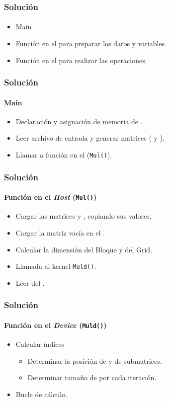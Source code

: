 \frame
{
\frametitle{Solución}
\framesubtitle{}
\begin{itemize}
	\item<1-> Main
	\item<2-> Función en el  para preparar los datos y variables.
	\item<3-> Función en el  para realizar las operaciones.
\end{itemize}
}


\frame
{
\frametitle{Solución}
\framesubtitle{Main}
\begin{itemize}
	\item<1-> Declaración y asignación de memoria de .
	\item<2-> Leer archivo de entrada y generar matrices ( y ).
	\item<3-> Llamar a función en el  (\texttt{Mul()}).
\end{itemize}
}

\frame
{
\frametitle{Solución}
\framesubtitle{Función en el \emph{Host} (\texttt{Mul()})}
\begin{itemize}
	\item<1-> Cargar las matrices  y , copiando sus valores.
	\item<2-> Cargar la matriz vacía  en el .
	\item<3-> Calcular la dimensión del Bloque y del Grid.
	\item<4-> Llamada al kernel \texttt{Muld()}.
	\item<5-> Leer  del .
\end{itemize}
}

\frame
{
\frametitle{Solución}
\framesubtitle{Función en el \emph{Device} (\texttt{Muld()})}
\begin{itemize}
	\item<1->  Calcular índices
	\begin{itemize}
		\item<2-> Determinar la posición de  y  de submatrices.
		\item<3-> Determinar tamaño de  por cada iteración.
	\end{itemize}
 	\item<4-> Bucle de cálculo.
\end{itemize}
}
